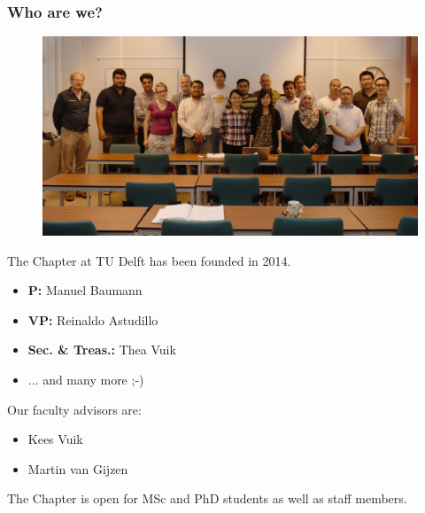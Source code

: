 \documentclass{beamer}
\begin{document}
\begin{frame}
\frametitle{Who are we?}
\begin{figure}
 \includegraphics[width=\textwidth]{images/group}
\end{figure}
\end{frame}

\begin{frame}
   The Chapter at TU Delft has been founded in 2014.

  \begin{itemize}
    \item \textbf{P:} Manuel Baumann
    \item \textbf{VP:} Reinaldo Astudillo
    \item \textbf{Sec. \& Treas.:} Thea Vuik
    \item ... and many more ;-)
  \end{itemize}

  Our faculty advisors are:
  \begin{itemize}
    \item Kees Vuik
    \item Martin van Gijzen
  \end{itemize}

  The Chapter is open for MSc and PhD students as well as staff members.
\end{frame}
\end{document}
